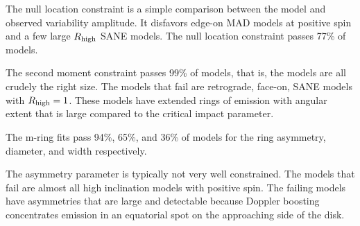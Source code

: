 

The null location constraint is a simple comparison between the model and observed variability amplitude.
It disfavors edge-on MAD models at positive spin and a few large $R_\mathrm{high}$ SANE models.
The null location constraint passes 77\% of models.



The second moment constraint passes 99\% of models, that is, the models are all crudely the right size.  The models that fail are retrograde, face-on, SANE models with $R_\mathrm{high} = 1$. These models have extended rings of emission with angular extent that is large compared to the critical impact parameter.

\label{sec:mring}

The m-ring fits pass 94\%, 65\%, and 36\% of models for the ring asymmetry, diameter, and width respectively.

The asymmetry parameter is typically not very well constrained.  The models that fail are almost all high inclination models with positive spin.  The failing models have asymmetries that are large and detectable because Doppler boosting concentrates emission in an equatorial spot on the approaching side of the disk.

